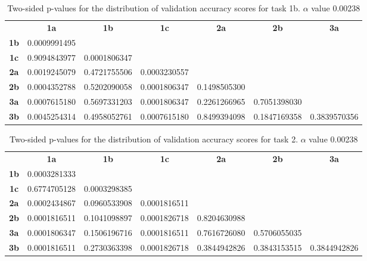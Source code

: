 \begin{table}[h!]
    \centering
    \begin{tabular}{ccccccc}
                & \textbf{1a}        & \textbf{1b}        & \textbf{1c}        & \textbf{2a}  & \textbf{2b}  & \textbf{3a}  \\
    \textbf{1b} & 0.0009991495       &                    &                    &              &              &              \\
    \textbf{1c} & 0.9094843977       & 0.0001806347       &                    &              &              &              \\
    \textbf{2a} & 0.0019245079       & 0.4721755506       & 0.0003230557       &              &              &              \\
    \textbf{2b} & 0.0004352788       & 0.5202090058       & 0.0001806347       & 0.1498505300 &              &              \\
    \textbf{3a} & 0.0007615180       & 0.5697331203       & 0.0001806347       & 0.2261266965 & 0.7051398030 &              \\
    \textbf{3b} & 0.0045254314       & 0.4958052761       & 0.0007615180       & 0.8499394098 & 0.1847169358 & 0.3839570356
    \end{tabular}
    \caption[p-table for validation accuracy (task 1b)]{Two-sided p-values for the distribution of validation accuracy scores for task 1b. \(\alpha\) value 0.00238}
    \label{tab:exp2.validation1b}
\end{table}

\begin{table}[h!]
    \centering
    \begin{tabular}{ccccccc}
                & \textbf{1a}        & \textbf{1b}        & \textbf{1c}        & \textbf{2a}  & \textbf{2b}  & \textbf{3a}  \\
    \textbf{1b} & 0.0003281333 &                    &                    &              &              &              \\
    \textbf{1c} & 0.6774705128 & 0.0003298385       &                    &              &              &              \\
    \textbf{2a} & 0.0002434867 & 0.0960533908       & 0.0001816511       &              &              &              \\
    \textbf{2b} & 0.0001816511 & 0.1041098897       & 0.0001826718       & 0.8204630988 &              &              \\
    \textbf{3a} & 0.0001806347 & 0.1506196716       & 0.0001816511       & 0.7616726080 & 0.5706055035 &              \\
    \textbf{3b} & 0.0001816511 & 0.2730363398       & 0.0001826718       & 0.3844942826 & 0.3843153515 & 0.3844942826
    \end{tabular}
    \caption[p-table for validation accuracy (task 2)]{Two-sided p-values for the distribution of validation accuracy scores for task 2. \(\alpha\) value 0.00238}
    \label{tab:exp2.validation2}
\end{table}

